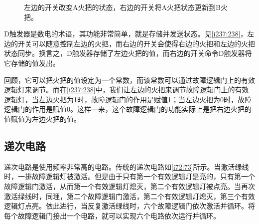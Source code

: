 \begin{example}[D触发器]\label{sec15}

\begin{figure}[!ht]
\begin{center}
\qquad
{}
\end{center}
\caption{左边的开关改变A火把的状态，右边的开关将A火把状态更新到B火把。}
\label{i237:238}
\end{figure}

D触发器是数电的术语，其功能非常简单，就是存储并发送状态。见\autoref{i237:238}，左边的开关可以随意控制左边的火把，而右边的开关会使得右边的火把和左边的火把状态同步。换言之，D触发器存储了左边火把的值，而右边的开关命令D触发器将它存储的值发出。

回顾，它可以把火把的值设定为一个常数，而该常数可以通过故障逻辑门上的有效逻辑灯来调节。而在\autoref{i237:238}中，我们让左边的火把来调节故障逻辑门上的有效逻辑灯，当左边火把为1时，故障逻辑门的作用是赋值1；当左边火把为0时，故障逻辑门的作用是赋值0。这样一来，这个故障逻辑门的功能实际上是把右边火把的值赋值为左边火把的值。
\end{example}

\subsection{递次电路}\label{sec35}

递次电路是使用频率非常高的电路。传统的递次电路如\autoref{i72:73}所示。当激活绿线时，一排故障逻辑灯被激活。但是由于只有第一个有效逻辑灯是亮的，只有第一个故障逻辑门激活，从而第一个有效逻辑灯熄灭，第二个有效逻辑灯被点亮。当再次激活绿线时，同理，第二个故障逻辑门激活，第二个有效逻辑灯熄灭，第三个有效逻辑灯点亮。依此进行，当反复激活绿线时，六个故障逻辑门依次激活并循环。将每个故障逻辑门接出一个电路，就可以实现六个电路依次运行并循环。

\begin{figure}[!ht]
\begin{center}
\end{center}
\caption{}
\label{i72:73}
\end{figure}

